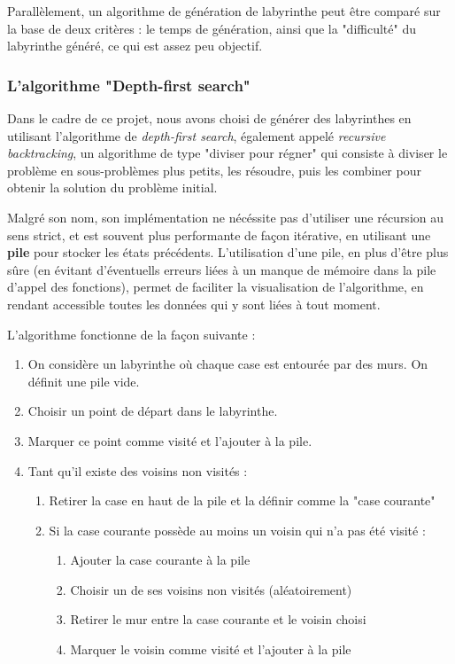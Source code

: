 \documentclass[12pt]{scrreprt} %
\begin{document}
Parallèlement, un algorithme de génération de labyrinthe peut être comparé sur la base de deux critères : le temps de génération, ainsi que la "difficulté" du labyrinthe généré, ce qui est assez peu objectif.

\subsubsection{L'algorithme "Depth-first search"}

Dans le cadre de ce projet, nous avons choisi de générer des labyrinthes en utilisant l'algorithme de \textit{depth-first search}, également appelé \textit{recursive backtracking}, un algorithme de type "diviser pour régner" qui consiste à diviser le problème en sous-problèmes plus petits, les résoudre, puis les combiner pour obtenir la solution du problème initial.

Malgré son nom, son implémentation ne nécéssite pas d'utiliser une récursion au sens strict, et est souvent plus performante de façon itérative, en utilisant une \textbf{pile} pour stocker les états précédents. L'utilisation d'une pile, en plus d'être plus sûre (en évitant d'éventuells erreurs liées à un manque de mémoire dans la pile d'appel des fonctions), permet de faciliter la visualisation de l'algorithme, en rendant accessible toutes les données qui y sont liées à tout moment.

L'algorithme fonctionne de la façon suivante :

\begin{enumerate}
    \item On considère un labyrinthe où chaque case est entourée par des murs. On définit une pile vide.
    \item Choisir un point de départ dans le labyrinthe.
    \item Marquer ce point comme visité et l'ajouter à la pile.
    \item Tant qu'il existe des voisins non visités :
          \begin{enumerate}
              \item Retirer la case en haut de la pile et la définir comme la "case courante"
              \item Si la case courante possède au moins un voisin qui n'a pas été visité :
                    \begin{enumerate}
                        \item Ajouter la case courante à la pile
                        \item Choisir un de ses voisins non visités (aléatoirement)
                        \item Retirer le mur entre la case courante et le voisin choisi
                        \item Marquer le voisin comme visité et l'ajouter à la pile
                    \end{enumerate}
          \end{enumerate}
\end{enumerate}
\end{document}
